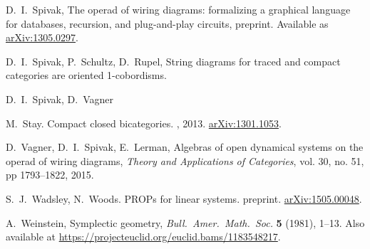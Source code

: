 \begin{thebibliography}{RSW00}
     D.\ I.\  Spivak, The operad of wiring diagrams:
    formalizing a graphical language for databases, recursion, and plug-and-play
    circuits, preprint. Available as
    \href{http://arxiv.org/abs/1305.0297}{arXiv:1305.0297}.

     D.\ I.\ Spivak, P.\ Schultz, D.\ Rupel,
    String diagrams for traced and compact categories are oriented 1-cobordisms.

     D.\ I.\ Spivak, D.\ Vagner

    M.\ Stay.
    \newblock Compact closed bicategories.
    , 2013. 
    \newblock \href{http://arxiv.org/abs/1301.1053}{arXiv:1301.1053}.


     D.\ Vagner, D.\ I.\ Spivak, E.\ Lerman, Algebras of open
    dynamical systems on the operad of wiring diagrams, \emph{Theory and
    Applications of Categories}, vol. 30, no. 51, pp 1793--1822, 2015. 





     S.\ J.\ Wadsley, N.\ Woods. 
    \newblock PROPs for linear systems.
    \newblock preprint. 
    \newblock \href{http://arxiv.org/abs/1505.00048}{arXiv:1505.00048}.

     A.\ Weinstein, Symplectic geometry, {\sl Bull.\ Amer.\ Math.\ 
    Soc.} {\bf 5} (1981), 1--13.  Also available at 	
    \href{https://projecteuclid.org/euclid.bams/1183548217}
    {https://projecteuclid.org/euclid.bams/1183548217}.


\end{thebibliography}
